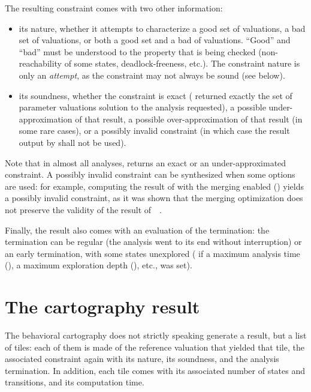 The resulting constraint comes with two other information:
\begin{itemize}
	\item its nature, \ie{} whether it attempts to characterize a good set of valuations, a bad set of valuations, or both a good set and a bad of valuations.
	      ``Good'' and ``bad'' must be understood to the property that is being checked (non-reachability of some states, deadlock-freeness, etc.).
	      The constraint nature is only an \emph{attempt}, as the constraint may not always be sound (see below).
	\item its soundness, \ie{} whether the constraint is exact (\imitator{} returned exactly the set of parameter valuations solution to the analysis requested), a possible under-approximation of that result, a possible over-approximation of that result (in some rare cases), or a possibly invalid constraint (in which case the result output by \imitator{} shall not be used).
\end{itemize}
Note that in almost all analyses, \imitator{} returns an exact or an under-approximated constraint.
A possibly invalid constraint can be synthesized when some options are used: for example, computing the result of \IM{} with the merging enabled () yields a possibly invalid constraint, as it was shown that the merging optimization does not preserve the validity of the result of~\IM{}~\cite{AFS13atva}.

Finally, the result also comes with an evaluation of the termination: the termination can be regular (the analysis went to its end without interruption) or an early termination, with some states unexplored (\eg{} if a maximum analysis time (), a maximum exploration depth (), etc., was set).


\section{The cartography result}

The behavioral cartography does not strictly speaking generate a result, but a list of tiles: each of them is made of the reference valuation that yielded that tile, the associated constraint again with its nature, its soundness, and the analysis termination.
In addition, each tile comes with its associated number of states and transitions, and its computation time.



